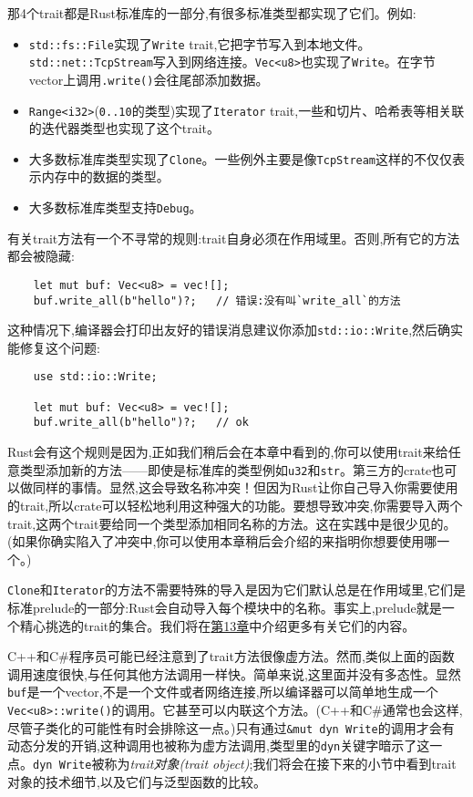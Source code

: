 那4个trait都是Rust标准库的一部分,有很多标准类型都实现了它们。例如:
\begin{itemize}
    \item \texttt{std::fs::File}实现了\texttt{Write} trait,它把字节写入到本地文件。\texttt{std::net::TcpStream}写入到网络连接。\texttt{Vec<u8>}也实现了\texttt{Write}。在字节vector上调用\texttt{.write()}会往尾部添加数据。
    \item \texttt{Range<i32>}(\texttt{0..10}的类型)实现了\texttt{Iterator} trait,一些和切片、哈希表等相关联的迭代器类型也实现了这个trait。
    \item 大多数标准库类型实现了\texttt{Clone}。一些例外主要是像\texttt{TcpStream}这样的不仅仅表示内存中的数据的类型。
    \item 大多数标准库类型支持\texttt{Debug}。
\end{itemize}

有关trait方法有一个不寻常的规则:trait自身必须在作用域里。否则,所有它的方法都会被隐藏:
\begin{verbatim}
    let mut buf: Vec<u8> = vec![];
    buf.write_all(b"hello")?;   // 错误:没有叫`write_all`的方法
\end{verbatim}

这种情况下,编译器会打印出友好的错误消息建议你添加\texttt{std::io::Write},然后确实能修复这个问题:
\begin{verbatim}
    use std::io::Write;

    let mut buf: Vec<u8> = vec![];
    buf.write_all(b"hello")?;   // ok
\end{verbatim}

Rust会有这个规则是因为,正如我们稍后会在本章中看到的,你可以使用trait来给任意类型添加新的方法——即使是标准库的类型例如\texttt{u32}和\texttt{str}。第三方的crate也可以做同样的事情。显然,这会导致名称冲突！但因为Rust让你自己导入你需要使用的trait,所以crate可以轻松地利用这种强大的功能。要想导致冲突,你需要导入两个trait,这两个trait要给同一个类型添加相同名称的方法。这在实践中是很少见的。(如果你确实陷入了冲突中,你可以使用本章稍后会介绍的来指明你想要使用哪一个。)

\texttt{Clone}和\texttt{Iterator}的方法不需要特殊的导入是因为它们默认总是在作用域里,它们是标准prelude的一部分:Rust会自动导入每个模块中的名称。事实上,prelude就是一个精心挑选的trait的集合。我们将在\hyperref[ch13]{第13章}中介绍更多有关它们的内容。

C++和C\#程序员可能已经注意到了trait方法很像虚方法。然而,类似上面的函数调用速度很快,与任何其他方法调用一样快。简单来说,这里面并没有多态性。显然\texttt{buf}是一个vector,不是一个文件或者网络连接,所以编译器可以简单地生成一个\texttt{Vec<u8>::write()}的调用。它甚至可以内联这个方法。(C++和C\#通常也会这样,尽管子类化的可能性有时会排除这一点。)只有通过\texttt{\&mut dyn Write}的调用才会有动态分发的开销,这种调用也被称为虚方法调用,类型里的\texttt{dyn}关键字暗示了这一点。\texttt{dyn Write}被称为\emph{trait对象(trait object)};我们将会在接下来的小节中看到trait对象的技术细节,以及它们与泛型函数的比较。


